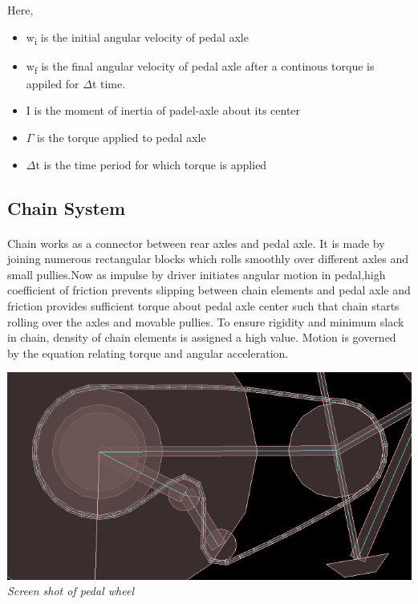 \documentclass[11pt]{article}
\begin{document}
Here, 	
\begin{itemize}
\item w\textsubscript{i} is the initial angular velocity of pedal axle
\item w\textsubscript{f} is the final angular velocity of pedal axle after a continous torque is appiled for $\Delta${t} time.
\item I is the moment of inertia of padel-axle about its center
\item $\Gamma$ is the torque applied to pedal axle
\item $\Delta${t} is the time period for which torque is applied
\end{itemize}

	

\subsection{Chain System}
\paragraph{}

	Chain works as a connector between rear axles and pedal axle. It is made by joining numerous rectangular blocks which rolls smoothly
	over different axles and small pullies.Now as impulse by driver initiates angular motion in pedal,high coefficient of friction prevents
	slipping between chain elements and pedal axle and friction provides sufficient torque about pedal axle center such that chain 
	starts rolling over the axles and movable pullies. To ensure rigidity and minimum slack in chain, density of chain elements is 
	assigned a high value. Motion is governed by the equation relating torque and angular acceleration.
	
	\begin{center}
	 \includegraphics[scale = 0.4]{images/chain} \\
	  \emph{Screen shot of pedal wheel} \\
	\end{center}
\end{document}
